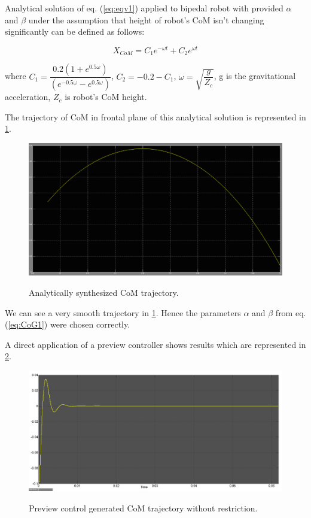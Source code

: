 \documentclass[12pt,a4paper]{report}
\begin{document}
			Analytical solution of eq. (\ref{eq:eqv1}) applied to bipedal robot with provided $\alpha$ and $\beta$ under the assumption that height of robot's CoM isn't changing significantly can be defined as follows:
			
			\begin{equation}
				X_{CoM} = C_1 e^{-\omega t} + C_2 e^{\omega t}
			\end{equation}
			
			where $C_1 = \dfrac{0.2(1+e^{0.5\omega })}{(e^{-0.5\omega }-e^{0.5\omega })}$, $C_2=-0.2-C_1$, $\omega = \sqrt{\dfrac{g}{Z_c}}$, g is the gravitational acceleration, $Z_c$ is robot's CoM height.
			
			The trajectory of CoM in frontal plane of this analytical solution is represented in \cref{fig:24}.
			
			\begin{figure}[H]
				\vspace{-0.2cm}
				\centering
				{\includegraphics[width=1\textwidth]{24}}
				\caption{Analytically synthesized CoM trajectory.}
				\label{fig:24}
				\vspace{-0.1cm}
			\end{figure}
			
			We can see a very smooth trajectory in \cref{fig:24}. Hence the parameters $\alpha$ and $\beta$ from eq. (\ref{eq:CoG1}) were chosen correctly. 
			
			A direct application of a preview controller shows results which are represented in \cref{fig:25}.
			
			\begin{figure}[H]
				\vspace{-0.2cm}
				\centering
				{\includegraphics[width=1\textwidth]{25}}
				\caption{Preview control generated CoM trajectory without restriction.}
				\label{fig:25}
				\vspace{-0.1cm}
			\end{figure}
			
\end{document}
